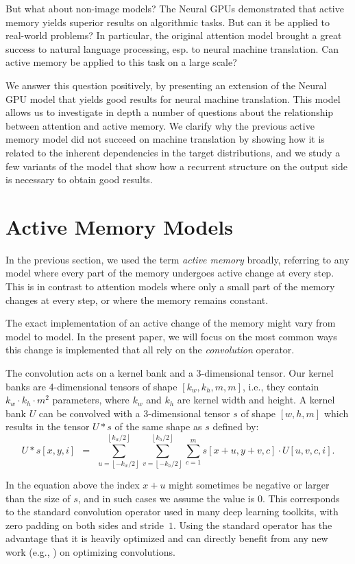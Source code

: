 \documentclass{article}
\newcommand\floor[1]{\left \lfloor{#1}\right \rfloor}
\begin{document}
But what about non-image models? The Neural GPUs \cite{neural_gpu} demonstrated
that active memory yields superior results on algorithmic tasks.
But can it be applied to real-world problems? In particular, the original
attention model brought a great success to natural language processing,
esp. to neural machine translation.
Can active memory be applied to this task on a large scale?

We answer this question positively, by presenting an extension of
the Neural GPU model that yields good results for neural machine translation.
This model allows us to investigate in depth a number of questions
about the relationship between attention and active memory.
We clarify why the previous active memory model did not succeed
on machine translation by showing how it is related to
the inherent dependencies in the target distributions,
and we study a few variants of the model that show
how a recurrent structure on the output side is necessary to obtain good results.


\section{Active Memory Models} \label{sec:cgrn}

In the previous section, we used the term \emph{active memory} broadly,
referring to any model where every part of the memory
undergoes active change at every step.
This is in contrast to attention models where only
a small part of the memory changes at every step,
or where the memory remains constant.

The exact implementation of an active change of the memory might
vary from model to model. In the present paper, we will focus on
the most common ways this change is implemented that all rely
on the \emph{convolution} operator.

The convolution acts on a kernel bank and a 3-dimensional tensor.
Our kernel banks are 4-dimensional tensors of shape $[k_w, k_h, m, m]$,
i.e., they contain $k_w \cdot k_h \cdot m^2$ parameters,
where $k_w$ and $k_h$ are kernel width and height. A kernel bank $U$
can be convolved with a 3-dimensional tensor $s$ of shape $[w, h, m]$ which
results in the tensor $U * s$ of the same shape as $s$ defined by:
\[ U * s[x,y,i] \ \ =\ \ \sum_{u=\floor{-k_w/2}}^{\floor{k_w/2}}\sum_{v=\floor{-k_h/2}}^{\floor{k_h/2}}\sum_{c=1}^{m}
     s[x+u,y+v,c] \cdot U[u,v,c,i]. \]

In the equation above the index $x+u$ might sometimes be negative
or larger than the size of $s$, and in such cases we assume the value
is $0$. This corresponds to the standard convolution operator used in
many deep learning toolkits, with zero padding on both sides
and stride~$1$. Using the standard operator has the advantage that
it is heavily optimized and can directly benefit from any new work
(e.g., \cite{fastconv}) on optimizing convolutions.
\end{document}
